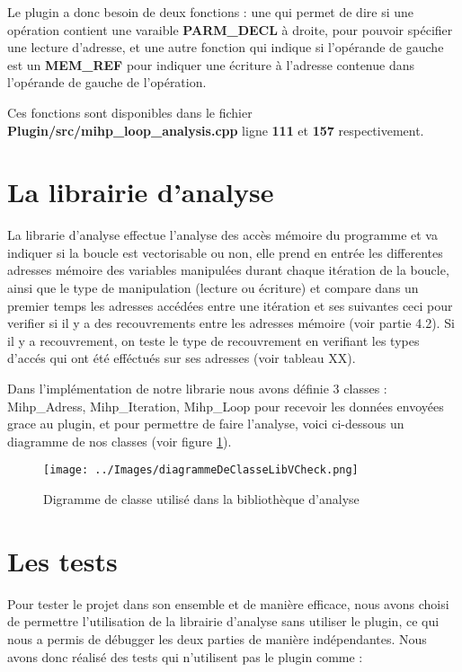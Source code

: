 \documentclass[12pt,french]{article}
\begin{document}
Le plugin a donc besoin de deux fonctions : une qui permet de dire si une opération contient une varaible \textbf{PARM\_DECL} à droite, pour pouvoir spécifier une lecture d'adresse, et une autre fonction qui indique si l'opérande de gauche est un \textbf{MEM\_REF} pour indiquer une écriture à l'adresse contenue dans l'opérande de gauche de l'opération.

Ces fonctions sont disponibles dans le fichier \textbf{Plugin/src/mihp\_loop\_analysis.cpp} ligne \textbf{111} et \textbf{157} respectivement.

\section{\color{blue}La librairie d'analyse}

La librarie d'analyse effectue l'analyse des accès mémoire du programme et va indiquer si la boucle est vectorisable ou non, elle prend en entrée les differentes adresses mémoire des variables manipulées durant chaque itération de la boucle, ainsi que le type de manipulation (lecture ou écriture) et compare dans un premier temps les adresses accédées entre une itération et ses suivantes ceci pour verifier si il y a des recouvrements entre les adresses mémoire (voir partie 4.2). Si il y a recouvrement, on teste le type de recouvrement en verifiant les types d'accés qui ont été efféctués sur ses adresses (voir tableau XX).

Dans l'implémentation de notre librarie nous avons définie 3 classes : Mihp\_Adress, Mihp\_Iteration, Mihp\_Loop pour recevoir les données envoyées grace au plugin, et pour permettre de faire l'analyse, voici ci-dessous un diagramme de nos classes (voir figure \ref{DiagrammeClasseLib}).

\begin{figure}
	\begin{center}
		\texttt{[image: ../Images/diagrammeDeClasseLibVCheck.png]}
	\end{center}
	\caption{Digramme de classe utilisé dans la bibliothèque d'analyse}
	\label{DiagrammeClasseLib}
\end{figure}

\section{\color{blue}Les tests}

Pour tester le projet dans son ensemble et de manière efficace, nous avons choisi de permettre l'utilisation de la librairie d'analyse sans utiliser le plugin, ce qui nous a permis de débugger les deux parties de manière indépendantes. Nous avons donc réalisé des tests qui n'utilisent pas le plugin comme :
\end{document}
